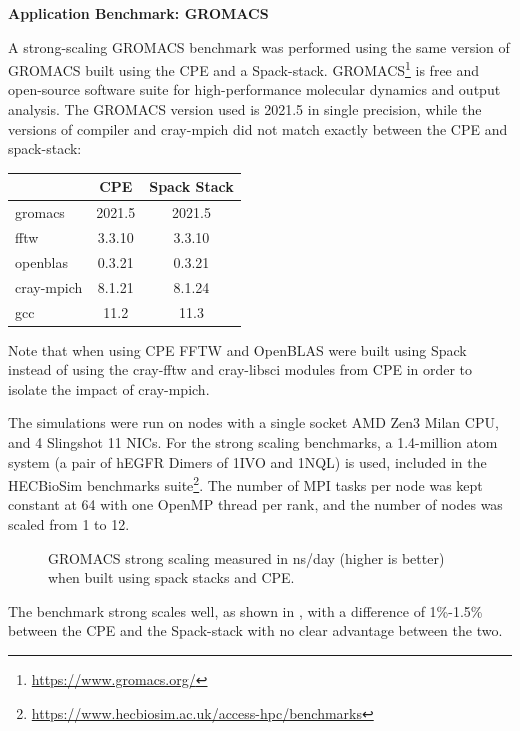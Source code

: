 \noindent\textbf{Application Benchmark: GROMACS}

A strong-scaling GROMACS benchmark was performed using the same version of GROMACS built using the CPE and a Spack-stack.
GROMACS\footnote{\url{https://www.gromacs.org/}} is free and open-source software suite for high-performance molecular dynamics and output analysis.
The GROMACS version used is 2021.5 in single precision, while the versions of compiler and cray-mpich did not match exactly between the CPE and spack-stack:
\begin{center}
    \begin{tabular}{l |c  c }
                      & CPE   & Spack Stack \\
          \hline
        gromacs       & 2021.5   & 2021.5   \\
        fftw          & 3.3.10   & 3.3.10   \\
        openblas      & 0.3.21   & 0.3.21   \\
        cray-mpich    & 8.1.21   & 8.1.24   \\
        gcc           & 11.2     & 11.3     \\
    \end{tabular}
\end{center}
Note that when using CPE FFTW and OpenBLAS were built using Spack instead of using the cray-fftw and cray-libsci modules from CPE in order to isolate the impact of cray-mpich.

The simulations were run on nodes with a single socket AMD Zen3 Milan CPU, and 4 Slingshot 11 NICs.
For the strong scaling benchmarks, a 1.4-million atom system (a pair of hEGFR Dimers of 1IVO and 1NQL) is used, included in the HECBioSim benchmarks suite\footnote{\url{https://www.hecbiosim.ac.uk/access-hpc/benchmarks}}.
The number of MPI tasks per node was kept constant at 64 with one OpenMP thread per rank, and the number of nodes was scaled from 1 to 12.

\begin{figure}[htp!]
    \begin{center}
        
    \end{center}
    \caption{GROMACS strong scaling measured in ns/day (higher is better) when built using spack stacks and CPE.}
    \label{fig:gromacs-strong}
\end{figure}

The benchmark strong scales well, as shown in , with a difference of 1\%-1.5\% between the CPE and the Spack-stack with no clear advantage between the two.

